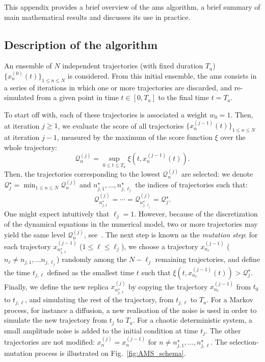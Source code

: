\documentclass{jfm}
\begin{document}
This appendix provides a brief overview of the \ac{ams} algorithm, a brief summary of main
mathematical results and discusses its use in practice.

\subsection{Description of the algorithm}
An ensemble of $N$ independent trajectories (with fixed duration $T_a$) $\{x_n^{(0)}(t)\}_{1\leq n \leq N}$ is considered.
%
From this initial ensemble, the \ac{ams} consists in a series of iterations in which one or more trajectories are discarded, and re-simulated from a given point in time $t \in [0, T_a]$ to the final time $t = T_a$.

To start off with, each of these trajectories is associated a weight $w_0=1$.
Then, at iteration $j\geq 1$, we evaluate the score of all trajectories $\{x_n^{(j-1)}(t)\}_{1 \leq n \leq N}$ at iteration $j-1$, measured by the maximum of the score function $\xi$ over the whole trajectory:
\begin{equation}
\mathcal{Q}_n^{(j)} = \sup_{0 \leq t \leq T_a} \xi(t,x_n^{(j-1)}(t)).
\end{equation}
Then, the trajectories corresponding to the lowest $\mathcal{Q}_n^{(j)}$ are selected: we denote $\mathcal{Q}_j^\star= \min_{1\leq n \leq N} \mathcal{Q}_n^{(j)}$ and $n_{j,1}^\star,\ldots,n_{j,\ell_j}^\star$ the indices of trajectories such that:
\begin{equation}
\label{eq:ams_threshold_def}
\mathcal{Q}_{n_{j,1}^\star}^{(j)} = \cdots = \mathcal{Q}_{n_{j,\ell_j}^\star}^{(j)} = \mathcal{Q}_j^\star.
\end{equation}
One might expect intuitively that $\ell_j=1$.
However, because of the discretization of the dynamical equations in the numerical model, two or more trajectories may yield the same level $\mathcal{Q}_n^{(j)}$, see~\cite{brehier:hal-01142704}.
The next step is known as the \textit{mutation step}: for each trajectory $x_{n_{j,\ell}^\star}^{(j-1)}$ ($1 \leq \ell \leq \ell_j$), we choose a trajectory $x_{n_\ell}^{(j-1)}$ ($n_{\ell} \neq n_{j,1},\ldots n_{j,\ell_j}$) randomly among the $N-\ell_j$ remaining trajectories, and define the time $t_{j,\ell}$ defined as the smallest time $t$ such that $\xi(t,x_{n_\ell}^{(j-1)}(t))>\mathcal{Q}_j^\star$.
Finally, we define the new replica $x_{n_{j,\ell}^\star}^{(j)}$ by copying the trajectory $x_{n_\ell}^{(j-1)}$ from $t_0$ to $t_{j,\ell}$, and simulating the rest of the trajectory, from $t_{j,\ell}$ to $T_a$.
For a Markov process, for instance a diffusion, a new realisation of the noise is used in order to simulate the new trajectory from $t_j$ to $T_a$.
For a chaotic deterministic system, a small amplitude noise is added to the initial condition at time $t_j$.
The other trajectories are not modified: $x_n^{(j)}=x_n^{(j-1)}$ for $n \neq n_{j,1}^\star,\ldots,n_{j,\ell}^\star$.
The selection-mutation process is illustrated on Fig.~\ref{fig:AMS_schema}.
\end{document}
